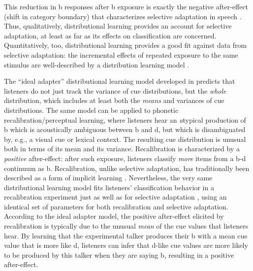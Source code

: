 This reduction in \ph b responses after \ph b exposure is exactly the negative after-effect (shift in category boundary) that characterizes selective adaptation in speech \autocite{Eimas1973,Samuel1986}.  Thus, qualitatively, distributional learning provides an account for selective adaptation, at least as far as its effects on classification are concerned.  Quantitatively, too, distributional learning provides a good fit against data from selective adaptation: the incremental effects of repeated exposure to the same stimulus are well-described by a distribution learning model \autocite[$r^2=0.85$,][]{Kleinschmidt2015}. 

\label{r2-whole-distribution-1}
The ``ideal adapter'' distributional learning model developed in \textcite{Kleinschmidt2015} predicts that listeners do not just track the variance of cue distributions, but the \emph{whole} distribution, which includes at least both the \emph{means} and variances of cue distributions.  The same model can be applied to phonetic recalibration/perceptual learning, where listeners hear an {\em a}typical production of \ph b which is acoustically ambiguous between \ph b and \ph d, but which is disambiguated by, e.g., a visual cue or lexical context.  The resulting cue distribution is unusual both in terms of its mean and its variance.  Recalibration is characterized by a \emph{positive} after-effect: after such exposure, listeners classify \emph{more} items from a \ph b-\ph d continuum as \ph b.  Recalibration, unlike selective adaptation, has traditionally been described as a form of implicit learning \autocite{Norris2003,Vroomen2004,Vroomen2007}.  Nevertheless, the very same distributional learning model fits listeners' classification behavior in a recalibration experiment just as well as for selective adaptation \autocite[$r^2 = 0.86$,][]{Kleinschmidt2015}, using an identical set of parameters for both recalibration and selective adaptation.  According to the ideal adapter model, the positive after-effect elicited by recalibration is typically due to the unusual \emph{mean} of the cue values that listeners hear.  By learning that the experimental talker produces their \ph b with a mean cue value that is more like \ph d, listeners can infer that \ph d-like cue values are more likely to be produced by this talker when they are saying \ph b, resulting in a positive after-effect.

